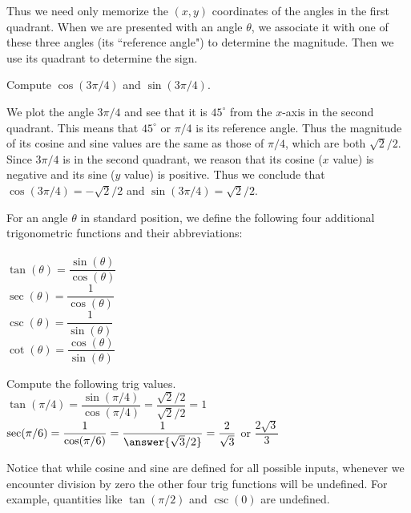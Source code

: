 \documentclass{ximera}
\begin{document}
Thus we need only memorize the $(x,y)$ coordinates of the angles in the first quadrant. When we are presented with an angle $\theta$, we associate it with one of these three angles (its ``reference angle") to determine the magnitude. Then we use its quadrant to determine the sign.

\begin{example}
Compute $\cos(3\pi/4)$ and $\sin(3\pi/4)$.
\begin{explanation}
We plot the angle $3\pi/4$ and see that it is $45^{\circ}$ from the $x$-axis in the second quadrant. This means that $45^{\circ}$ or $\pi/4$ is its reference angle. Thus the magnitude of its cosine and sine values are the same as those of $\pi/4$, which are both $\sqrt{2}/2$. Since $3\pi/4$ is in the second quadrant, we reason that its cosine ($x$ value) is negative and its sine ($y$ value) is positive. Thus we conclude that $\cos(3\pi/4)=-\sqrt{2}/2$ and $\sin(3\pi/4)=\sqrt{2}/2$.
\end{explanation}
\end{example}    

\begin{definition}
For an angle $\theta$ in standard position, we define the following four additional trigonometric functions and their abbreviations:
\\
\\ $\tan(\theta)=\dfrac{\sin(\theta)}{\cos(\theta)}$
\\ $\sec(\theta)=\dfrac{1}{\cos(\theta)}$
\\ $\csc(\theta)=\dfrac{1}{\sin(\theta)}$
\\ $\cot(\theta)=\dfrac{\cos(\theta)}{\sin(\theta)}$
\end{definition}
    
\begin{example}
Compute the following trig values.
\\$\tan(\pi/4)=\dfrac{\sin(\pi/4)}{\cos(\pi/4)}=\dfrac{\sqrt{2}/2}{\sqrt{2}/2}=1$
\\$\sec(\pi/6)=\dfrac{1}{\cos(\pi/6)}=\dfrac{1}{\answer{\sqrt{3}/2}}=\dfrac{2}{\sqrt{3}}$ or $\dfrac{2\sqrt{3}}{3}$

\end{example}    
    
Notice that while cosine and sine are defined for all possible inputs, whenever we encounter division by zero the other four trig functions will be undefined. For example, quantities like $\tan(\pi/2)$ and $\csc(0)$ are undefined.
    
\end{document}
